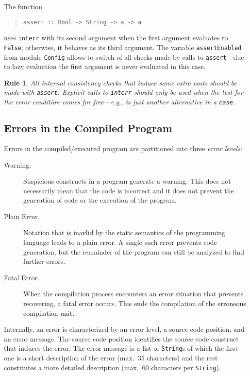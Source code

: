 \documentclass{report}
\newtheorem{designrule}{Rule}
\newcommand{\code}[1]{\texttt{#1}}
\begin{document}
The function
%
\begin{quote}
\begin{verbatim}
assert :: Bool -> String -> a -> a
\end{verbatim}
\end{quote}
%
uses \code{interr} with its second argument when the first argument evaluates
to \code{False}; otherwise, it behaves as its third argument. The variable
\code{assertEnabled} from module \code{Config} allows to switch of all checks
made by calls to \code{assert}---due to lazy evaluation the first argument is
never evaluated in this case.

\begin{designrule}
  All internal consistency checks that induce some extra costs should be made
  with \code{assert}. Explicit calls to \code{interr} should only be used when
  the test for the error condition comes for free---e.g., is just another
  alternative in a \code{case}.
\end{designrule}


\subsection{Errors in the Compiled Program}

Errors in the compiled/executed program are partitioned into three \emph{error
levels}: 
%
\begin{description}
\item[Warning.] Suspicious constructs in a program generate a warning. This
  does not necessarily mean that the code is incorrect and it does not prevent
  the generation of code or the execution of the program.
\item[Plain Error.] Notation that is inavlid by the static semantics of the
  programming language leads to a plain error. A single such error prevents 
  code generation, but the remainder of the program can still be analyzed to
  find further errors.
\item[Fatal Error.] When the compilation process encounters an error situation
  that prevents recovering, a fatal error occurs. This ends the compilation of
  the erroneous compilation unit.
\end{description}

Internally, an error is characterized by an error level, a source code
position, and an error message. The source code position identifies the source
code construct that induces the error. The error message is a list of
\code{String}s of which the first one is a short description of the error
(max.\ 35 characters) and the rest constitutes a more detailed description
(max.\ 60 characters per \code{String}).
\end{document}
